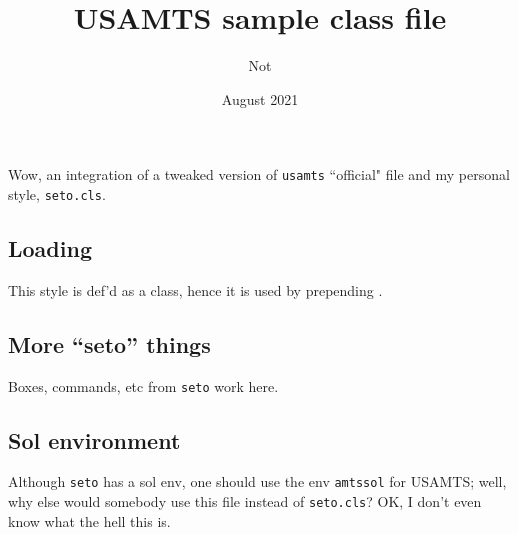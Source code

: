 \documentclass{usamts}
\title{USAMTS sample class file}
\author{Not \rname}
\date{August 2021}
\begin{document}
\maketitle
Wow, an integration of a tweaked version of \texttt{usamts} ``official" file and my personal style, \texttt{seto.cls}.
\toc
\begin{amtssol}
\subsection{Loading}
This style is def'd as a class, hence it is used by prepending .
\subsection{More ``seto'' things}
Boxes, commands, etc from \texttt{seto} work here.
\subsection{Sol environment}
Although \texttt{seto} has a sol env, one should use the env \texttt{amtssol} for USAMTS; well, why else would  somebody use this file instead of \texttt{seto.cls}?
OK, I don't even know what the hell this is.
\end{amtssol}
\end{document}
